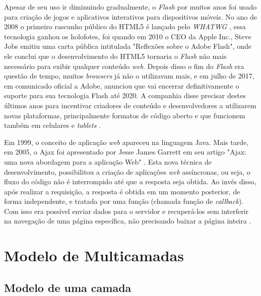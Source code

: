  Apesar de  seu uso ir diminuindo gradualmente, o \textit{Flash} por muitos anos foi usado para criação de jogos e aplicativos interativos para dispositivos móveis. No ano de 2008 o primeiro rascunho público do \ac{HTML}5 é lançado pelo \textit{WHATWG} \cite{fasthosts2018}, essa tecnologia ganhou os holofotes, foi quando em 2010 o CEO da Apple Inc., Steve Jobs emitiu uma carta pública intitulada "Reflexões sobre o Adobe Flash", onde ele conclui que o desenvolvimento do \ac{HTML}5 tornaria o \textit{Flash} não mais necessário para exibir qualquer conteúdo \textit{web}. Depois disso o fim do \textit{Flash} era questão de tempo, muitos \textit{browsers} já não o utilizavam mais, e em julho de 2017, em comunicado oficial a Adobe, anunciou que vai encerrar definitivamente o suporte para sua tecnologia Flash até 2020. A companhia disse precisar destes últimos anos para incentivar criadores de conteúdo e desenvolvedores a utilizarem novas plataformas, principalmente formatos de código aberto e que funcionem também em celulares e \textit{tablets}  \cite{canaltechFlashFim2018}.

Em 1999, o conceito de aplicação \textit{web} apareceu na linguagem Java. Mais tarde, em 2005, o Ajax foi apresentado por Jesse James Garrett em seu artigo "Ajax: uma nova abordagem para a aplicação Web"  \cite{devsaran2018}. Esta nova técnica de desenvolvimento, possibilitou a criação de aplicações \textit{web} assíncronas, ou seja, o fluxo do código não é interrompido até que a resposta seja obtida. Ao invés disso, após realizar a requisição, a resposta é obtida em um momento posterior, de forma independente, e tratada por uma função (chamada função de \textit{callback}). Com isso era possível enviar dados para o servidor e recuperá-los sem interferir na navegação de uma página específica, não precisando baixar a página inteira \cite{devmediaAsync2018}.


\section{Modelo de Multicamadas}
\label{s_c2_figuras}


\subsection*{Modelo de uma camada}

